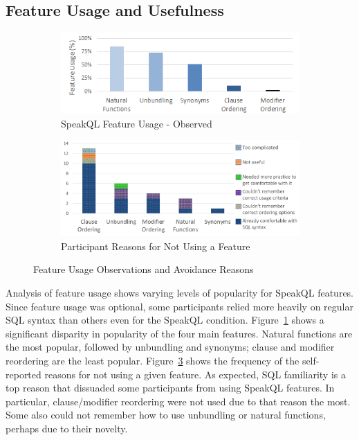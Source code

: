 \subsection{Feature Usage and Usefulness}
\begin{figure}
\begin{subfigure}{\linewidth}
  \centering
  \includegraphics[width=0.8\linewidth]{figures/feature_usage.png}
  \caption{SpeakQL Feature Usage - Observed}
  \label{fig:featureusage}
\end{subfigure}
\begin{subfigure}{\linewidth}
  \centering
  \includegraphics[width=0.8\linewidth]{figures/feature_unused_reasons_excel.png}
  \caption{Participant Reasons for Not Using a Feature}
  \label{fig:unusedfeatures}
\end{subfigure}
\caption{Feature Usage Observations and Avoidance Reasons}
\end{figure}
Analysis of feature usage shows varying levels of popularity for SpeakQL features. 
Since feature usage was optional, some participants relied more heavily on regular SQL syntax than others even for the SpeakQL condition. 
Figure~\ref{fig:featureusage} shows a significant disparity in popularity of the four main features. 
Natural functions are the most popular, followed by unbundling and synonyms; clause and modifier reordering are the least popular. 
Figure~\ref{fig:unusedfeatures} shows the frequency of the self-reported reasons for not using a given feature.
As expected, SQL familiarity is a top reason that dissuaded some participants from using SpeakQL features. 
In particular, clause/modifier reordering were not used due to that reason the most. 
Some also could not remember how to use unbundling or natural functions, perhaps due to their novelty.

